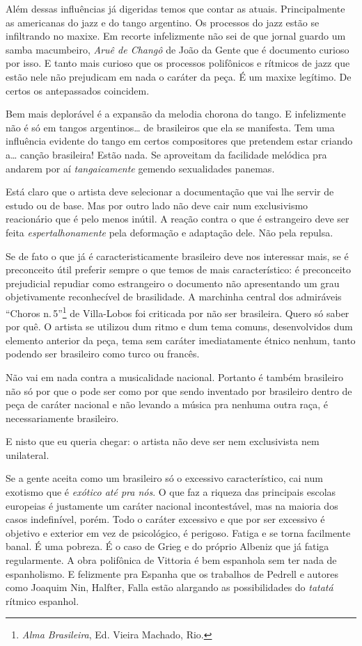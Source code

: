 Além dessas influências já digeridas temos que contar as atuais.
Principalmente as americanas do jazz e do tango argentino. Os processos
do jazz estão se infiltrando no maxixe. Em recorte infelizmente não sei
de que jornal guardo um samba macumbeiro, \textit{Aruê de Changô} de João
da Gente que é documento curioso por isso. E tanto mais curioso que os
processos polifônicos e rítmicos de jazz que estão nele não prejudicam
em nada o caráter da peça. É um maxixe legítimo. De certos os
antepassados coincidem.

Bem mais deplorável é a expansão da melodia chorona do tango. E
infelizmente não é só em tangos argentinos\ldots{} de brasileiros que ela se
manifesta. Tem uma influência evidente do tango em certos compositores
que pretendem estar criando a\ldots{} canção brasileira! Estão nada. Se
aproveitam da facilidade melódica pra andarem por aí \textit{tangaicamente}
gemendo sexualidades panemas.

Está claro que o artista deve selecionar a documentação que vai lhe
servir de estudo ou de base. Mas por outro lado não deve cair num
exclusivismo reacionário que é pelo menos inútil. A reação contra o que
é estrangeiro deve ser feita \textit{espertalhonamente} pela deformação e
adaptação dele. Não pela repulsa.

Se de fato o que já é caracteristicamente brasileiro deve nos interessar
mais, se é preconceito útil preferir sempre o que temos de mais
característico: é preconceito prejudicial repudiar como estrangeiro o
documento não apresentando um grau objetivamente reconhecível de
brasilidade. A marchinha central dos admiráveis ``Choros n.\,5''\footnote{\textit{Alma Brasileira}, Ed. Vieira Machado, Rio.} de
Villa-Lobos foi criticada por
não ser brasileira. Quero só saber por quê. O artista se utilizou dum
ritmo e dum tema comuns, desenvolvidos dum elemento anterior da peça,
tema sem caráter imediatamente étnico nenhum, tanto podendo ser
brasileiro como turco ou francês.

Não vai em nada contra a musicalidade nacional. Portanto é também
brasileiro não só por que o pode ser como por que sendo inventado por
brasileiro dentro de peça de caráter nacional e não levando a música pra
nenhuma outra raça, é necessariamente brasileiro.

E nisto que eu queria chegar: o artista não deve ser nem exclusivista
nem unilateral.

Se a gente aceita como um brasileiro só o excessivo característico, cai
num exotismo que é \textit{exótico até pra nós}. O que faz a riqueza das
principais escolas europeias é justamente um caráter nacional
incontestável, mas na maioria dos casos indefinível, porém. Todo o
caráter excessivo e que por ser excessivo é objetivo e exterior em vez
de psicológico, é perigoso. Fatiga e se torna facilmente banal. É uma
pobreza. É o caso de Grieg e do próprio Albeniz que já fatiga
regularmente. A obra polifônica de Vittoria é bem espanhola sem ter nada
de espanholismo. E felizmente pra Espanha que os trabalhos de Pedrell e
autores como Joaquim Nin, Halfter, Falla estão alargando as
possibilidades do \textit{tatatá} rítmico espanhol.

